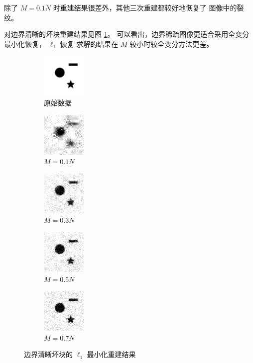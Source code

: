 除了 $M = 0.1N$ 时重建结果很差外，其他三次重建都较好地恢复了
图像中的裂纹。

对边界清晰的坏块重建结果见图 \ref{fig:L12dsharp}。
可以看出，边界稀疏图像更适合采用全变分最小化恢复， $\ell_1$ 恢复
求解的结果在 $M$ 较小时较全变分方法更差。

\begin{figure}
\centering
\begin{subfigure}[t]{1.1in}
	\includegraphics{Figure/testdata/2dsharp.png}
	\caption{原始数据}
\end{subfigure}
\begin{subfigure}[t]{1.1in}
	\includegraphics{Figure/L1/2dsharp10.png}
	\caption{$M = 0.1 N$}
\end{subfigure}
\begin{subfigure}[t]{1.1in}
	\includegraphics{Figure/L1/2dsharp30.png}
	\caption{$M = 0.3 N$}
\end{subfigure}
\begin{subfigure}[t]{1.1in}
	\includegraphics{Figure/L1/2dsharp50.png}
	\caption{$M = 0.5 N$}
\end{subfigure}
\begin{subfigure}[t]{1.1in}
	\includegraphics{Figure/L1/2dsharp70.png}
	\caption{$M = 0.7 N$}
\end{subfigure}
\caption{边界清晰坏块的 $\ell_1$ 最小化重建结果}
\label{fig:L12dsharp}
\end{figure}

